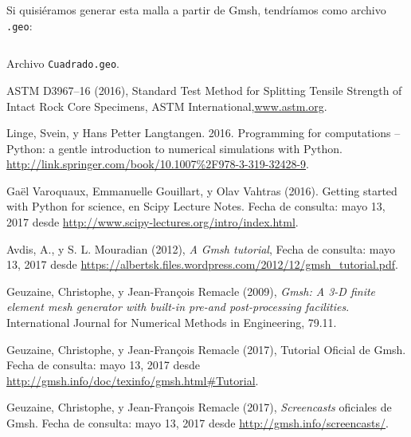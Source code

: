\documentclass[12pt,letterpaper]{article}
\begin{document}
Si quisiéramos generar esta malla a partir de Gmsh, tendríamos como archivo \texttt{.geo}:
\begin{listing}[H]
	\inputminted[mathescape,
               linenos,
               numbersep=5pt,
               gobble=0,
               frame=lines,
               framesep=2mm]{c}{Cuadrado.geo}
    \caption{Archivo \texttt{Cuadrado.geo}.}
    \label{lst:mater}
\end{listing}



\begin{thebibliography}{9}
	ASTM D3967--16 (2016),
	Standard Test Method for Splitting Tensile Strength of Intact Rock Core Specimens,
	ASTM International,\url{www.astm.org}.

   Linge, Svein, y Hans Petter Langtangen. 2016.
   Programming for computations -- Python: a gentle introduction to numerical simulations with Python.
   \url{http://link.springer.com/book/10.1007%2F978-3-319-32428-9}.
 
    Gaël Varoquaux, Emmanuelle Gouillart, y Olav Vahtras (2016).
    Getting started with Python for science, en Scipy Lecture Notes. 
    Fecha de consulta: mayo 13, 2017 desde \url{http://www.scipy-lectures.org/intro/index.html}.

    Avdis, A., y S. L. Mouradian (2012), 
    \emph{A Gmsh tutorial},
    Fecha de consulta: mayo 13, 2017 desde \url{https://albertsk.files.wordpress.com/2012/12/gmsh_tutorial.pdf}.
  
    Geuzaine, Christophe, y Jean-François Remacle (2009),
    \emph{Gmsh: A 3-D finite element mesh generator with built-in
    pre-and post-processing facilities}.
    International Journal for Numerical Methods in Engineering, 79.11.
    
 Geuzaine, Christophe, y Jean-François Remacle (2017),
 Tutorial Oficial de Gmsh.
 Fecha de consulta: mayo 13, 2017 desde \url{http://gmsh.info/doc/texinfo/gmsh.html#Tutorial}.

 Geuzaine, Christophe, y Jean-François Remacle (2017),
 \emph{Screencasts} oficiales de Gmsh.
 Fecha de consulta: mayo 13, 2017 desde \url{http://gmsh.info/screencasts/}.

\end{thebibliography}
\end{document}
